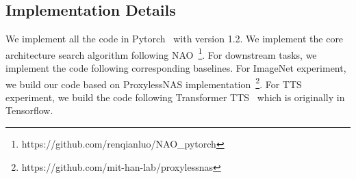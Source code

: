 \documentclass{article}
\begin{document}
\subsection{Implementation Details}
We implement all the code in Pytorch~\cite{pytorch} with version 1.2. We implement the core architecture search algorithm following NAO~\cite{nao}\footnote{https://github.com/renqianluo/NAO\_pytorch}. For downstream tasks, we implement the code following corresponding baselines. For ImageNet experiment, we build our code based on ProxylessNAS implementation~\footnote{https://github.com/mit-han-lab/proxylessnas}. For TTS experiment, we build the code following Transformer TTS~\cite{transformertts} which is originally in Tensorflow.
\end{document}
